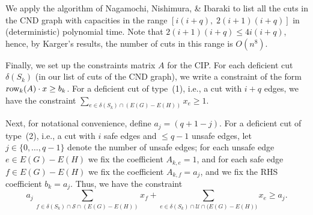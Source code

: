 \documentclass[11pt]{article}
\newcommand{\safe}{\mathscr{S}}
\newcommand{\unsafe}{\mathscr{U}}
\newcommand{\row}{\hbox{\textsl row}}
\begin{document}
\begin{appendices}
{We apply the algorithm of Nagamochi, Nishimura, \& Ibaraki \cite{NNI97}
to list all the cuts in the CND graph
with capacities in the range $[i(i+q),\;2(i+1)(i+q)]$
in (deterministic) polynomial time.
Note that $2(i+1)(i+q) \leq 4 i(i+q)$, hence, by Karger's results,
the number of cuts in this range is $O(n^8)$.

Finally, we set up the constraints matrix $A$ for the CIP.
For each deficient cut $\delta(S_k)$ (in our list of cuts of the CND graph),
we write a constraint of the form $\row_k(A) \cdot x \geq b_k$.
For a deficient cut of type~(1), i.e., a cut with $i+q$ edges,
we have the constraint $\sum_{e\in\delta(S_k)\cap{(E(G)-E(H))}}x_e\geq1$.

Next, for notational convenience, define $a_j = (q+1-j)$.
For a deficient cut of type~(2), i.e., a cut with $i$ safe edges and $\leq q-1$ unsafe edges,
let $j\in\{0,\dots,q-1\}$ denote the number of unsafe edges;
for each unsafe edge $e\in E(G)-E(H)$ we fix the coefficient $A_{k,e} = 1$, and
for each safe edge $f\in E(G)-E(H)$ we fix the coefficient $A_{k,f} = a_j$,
and we fix the RHS coefficient $b_k = a_j$.
Thus, we have the constraint
\[	a_j \, \sum_{f\in\delta(S_k)\cap\safe\cap{(E(G)-E(H))}}x_f +
        \sum_{e\in\delta(S_k)\cap\unsafe\cap{(E(G)-E(H)})}x_e \geq{a_j}.
\]
}


\end{appendices}


\end{document}
